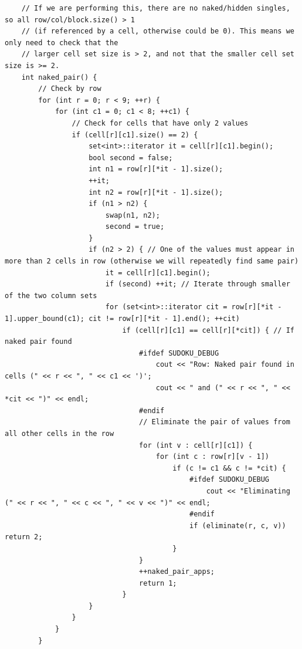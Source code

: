 \documentclass{article}
\begin{document}
\begin{lstlisting}
    // If we are performing this, there are no naked/hidden singles, so all row/col/block.size() > 1
    // (if referenced by a cell, otherwise could be 0). This means we only need to check that the
    // larger cell set size is > 2, and not that the smaller cell set size is >= 2.
    int naked_pair() {
        // Check by row
        for (int r = 0; r < 9; ++r) {
            for (int c1 = 0; c1 < 8; ++c1) {
                // Check for cells that have only 2 values
                if (cell[r][c1].size() == 2) {
                    set<int>::iterator it = cell[r][c1].begin();
                    bool second = false;
                    int n1 = row[r][*it - 1].size();
                    ++it;
                    int n2 = row[r][*it - 1].size();
                    if (n1 > n2) {
                        swap(n1, n2);
                        second = true;
                    }
                    if (n2 > 2) { // One of the values must appear in more than 2 cells in row (otherwise we will repeatedly find same pair)
                        it = cell[r][c1].begin();
                        if (second) ++it; // Iterate through smaller of the two column sets
                        for (set<int>::iterator cit = row[r][*it - 1].upper_bound(c1); cit != row[r][*it - 1].end(); ++cit)
                            if (cell[r][c1] == cell[r][*cit]) { // If naked pair found
                                #ifdef SUDOKU_DEBUG
                                    cout << "Row: Naked pair found in cells (" << r << ", " << c1 << ')';
                                    cout << " and (" << r << ", " << *cit << ")" << endl;
                                #endif
                                // Eliminate the pair of values from all other cells in the row
                                for (int v : cell[r][c1]) {
                                    for (int c : row[r][v - 1])
                                        if (c != c1 && c != *cit) {
                                            #ifdef SUDOKU_DEBUG
                                                cout << "Eliminating (" << r << ", " << c << ", " << v << ")" << endl;
                                            #endif
                                            if (eliminate(r, c, v)) return 2;
                                        }
                                }
                                ++naked_pair_apps;
                                return 1;
                            }
                    }
                }
            }
        }


\end{lstlisting}
\end{document}
